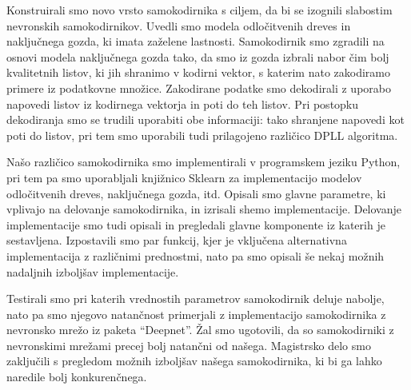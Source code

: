 \documentclass[12pt,a4paper,twoside]{article}
\theoremstyle{definition} %
\theoremstyle{plain} %
\numberwithin{equation}{section}  %
\begin{document}
Konstruirali smo novo vrsto samokodirnika s ciljem, da bi se izognili slabostim nevronskih samokodirnikov.
Uvedli smo modela odločitvenih dreves in naključnega gozda, ki imata zaželene lastnosti.
Samokodirnik smo zgradili na osnovi modela naključnega gozda tako, da smo iz gozda izbrali nabor čim bolj kvalitetnih listov, ki jih shranimo v kodirni vektor, s katerim nato zakodiramo primere iz podatkovne množice.
Zakodirane podatke smo dekodirali z uporabo napovedi listov iz kodirnega vektorja in poti do teh listov.
Pri postopku dekodiranja smo se trudili uporabiti obe informaciji: tako shranjene napovedi kot poti do listov, pri tem smo uporabili tudi prilagojeno različico DPLL algoritma.

Našo različico samokodirnika smo implementirali v programskem jeziku Python, pri tem pa smo uporabljali knjižnico Sklearn za implementacijo modelov odločitvenih dreves, naključnega gozda, itd. 
Opisali smo glavne parametre, ki vplivajo na delovanje samokodirnika, in izrisali shemo implementacije.
Delovanje implementacije smo tudi opisali in pregledali glavne komponente iz katerih je sestavljena.
Izpostavili smo par funkcij, kjer je vključena alternativna implementacija z različnimi prednostmi, nato pa smo opisali še nekaj možnih nadaljnih izboljšav implementacije.

Testirali smo pri katerih vrednostih parametrov samokodirnik deluje nabolje, nato pa smo njegovo natančnost primerjali z implementacijo samokodirnika z nevronsko mrežo iz paketa ``Deepnet''.
Žal smo ugotovili, da so samokodirniki z nevronskimi mrežami precej bolj natančni od našega.
Magistrsko delo smo zaključili s pregledom možnih izboljšav našega samokodirnika, ki bi ga lahko naredile bolj konkurenčnega.





\end{document}
